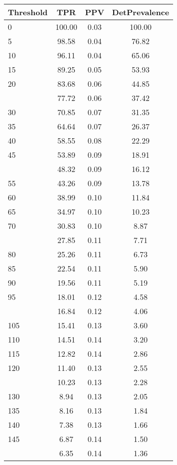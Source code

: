 \begin{table}[ht]
\centering
\begin{tabular}{lccc}
  \toprule
Threshold & TPR & PPV & DetPrevalence \\ 
  \midrule
0 & 100.00 & 0.03 & 100.00 \\ 
  5 & 98.58 & 0.04 & 76.82 \\ 
  10 & 96.11 & 0.04 & 65.06 \\ 
  15 & 89.25 & 0.05 & 53.93 \\ 
  20 & 83.68 & 0.06 & 44.85 \\ 
   \addlinespace
25 & 77.72 & 0.06 & 37.42 \\ 
  30 & 70.85 & 0.07 & 31.35 \\ 
  35 & 64.64 & 0.07 & 26.37 \\ 
  40 & 58.55 & 0.08 & 22.29 \\ 
  45 & 53.89 & 0.09 & 18.91 \\ 
   \addlinespace
50 & 48.32 & 0.09 & 16.12 \\ 
  55 & 43.26 & 0.09 & 13.78 \\ 
  60 & 38.99 & 0.10 & 11.84 \\ 
  65 & 34.97 & 0.10 & 10.23 \\ 
  70 & 30.83 & 0.10 & 8.87 \\ 
   \addlinespace
75 & 27.85 & 0.11 & 7.71 \\ 
  80 & 25.26 & 0.11 & 6.73 \\ 
  85 & 22.54 & 0.11 & 5.90 \\ 
  90 & 19.56 & 0.11 & 5.19 \\ 
  95 & 18.01 & 0.12 & 4.58 \\ 
   \addlinespace
100 & 16.84 & 0.12 & 4.06 \\ 
  105 & 15.41 & 0.13 & 3.60 \\ 
  110 & 14.51 & 0.14 & 3.20 \\ 
  115 & 12.82 & 0.14 & 2.86 \\ 
  120 & 11.40 & 0.13 & 2.55 \\ 
   \addlinespace
125 & 10.23 & 0.13 & 2.28 \\ 
  130 & 8.94 & 0.13 & 2.05 \\ 
  135 & 8.16 & 0.13 & 1.84 \\ 
  140 & 7.38 & 0.13 & 1.66 \\ 
  145 & 6.87 & 0.14 & 1.50 \\ 
   \addlinespace
150 & 6.35 & 0.14 & 1.36 \\ 

\end{tabular}
\end{table}
